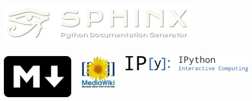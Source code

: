 \documentclass{beamer}
\begin{document}
\begin{frame}
\begin{columns}
\vspace{6mm}


\vspace{6mm}

\centerline{\includegraphics[width=0.4\linewidth]{testfigs/sphinx_logo.png}}

\vspace{6mm}


\end{columns}
\begin{columns}
\vspace{6mm}

\centerline{\includegraphics[width=0.2\linewidth]{testfigs/markdown_logo.jpg}}

\vspace{6mm}


\vspace{6mm}

\centerline{\includegraphics[width=0.2\linewidth]{testfigs/MediaWiki_logo.jpg}}

\vspace{6mm}


\vspace{6mm}

\centerline{\includegraphics[width=0.6\linewidth]{testfigs/IPython_logo.png}}

\vspace{6mm}


\end{columns}
\end{frame}
\end{document}

